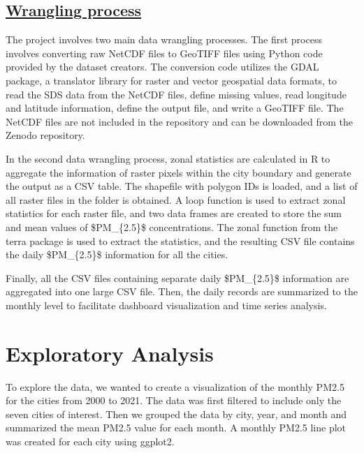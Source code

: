 \documentclass[
  12pt,
]{article}
\begin{document}
\hypertarget{wrangling-process}{%
\subsection{\texorpdfstring{\href{https://github.com/Artemis20123/FangLiRenZhang_ENV872_EDA_FinalProject/blob/main/Code/data\%20wrangling.Rmd}{Wrangling
process}}{Wrangling process}}\label{wrangling-process}}

The project involves two main data wrangling processes. The first
process involves converting raw NetCDF files to GeoTIFF files using
Python code provided by the dataset creators. The conversion code
utilizes the GDAL package, a translator library for raster and vector
geospatial data formats, to read the SDS data from the NetCDF files,
define missing values, read longitude and latitude information, define
the output file, and write a GeoTIFF file. The NetCDF files are not
included in the repository and can be downloaded from the Zenodo
repository.

In the second data wrangling process, zonal statistics are calculated in
R to aggregate the information of raster pixels within the city boundary
and generate the output as a CSV table. The shapefile with polygon IDs
is loaded, and a list of all raster files in the folder is obtained. A
loop function is used to extract zonal statistics for each raster file,
and two data frames are created to store the sum and mean values of
\$PM\_\{2.5\}\$ concentrations. The zonal function from the terra
package is used to extract the statistics, and the resulting CSV file
contains the daily \$PM\_\{2.5\}\$ information for all the cities.

Finally, all the CSV files containing separate daily \$PM\_\{2.5\}\$
information are aggregated into one large CSV file. Then, the daily
records are summarized to the monthly level to facilitate dashboard
visualization and time series analysis.

\newpage

\hypertarget{exploratory-analysis}{%
\section{Exploratory Analysis}\label{exploratory-analysis}}

To explore the data, we wanted to create a visualization of the monthly
PM2.5 for the cities from 2000 to 2021. The data was first filtered to
include only the seven cities of interest. Then we grouped the data by
city, year, and month and summarized the mean PM2.5 value for each
month. A monthly PM2.5 line plot was created for each city using
ggplot2.
\end{document}

